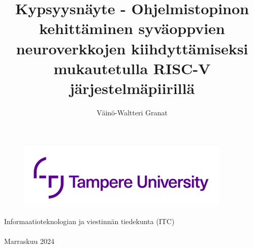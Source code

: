 \documentclass[12pt,a4paper,finnish
]{tunithesis}
\author{Väinö-Waltteri Granat}
\title{Kypsyysnäyte - Ohjelmistopinon kehittäminen syväoppvien neuroverkkojen kiihdyttämiseksi mukautetulla RISC-V järjestelmäpiirillä} %
\begin{document}
\makeatletter

\thispagestyle{empty}
\vspace*{-.5cm}\noindent

\begin{figure}
    \vspace{-1.3cm}
    \advance\leftskip-2.5cm
    \noindent\includegraphics{../thesis/img/tunilogo.png}
\end{figure}
 
\vspace{2.5cm}
\begin{flushright}
\noindent\textsf{\LARGE{\@author}}

\noindent\vspace{0.5cm}

\noindent\Huge{\textsf{\textbf{\textcolor{tunipurple}{\@title}}}}
\end{flushright}
\vspace{8.7cm} %

\begin{flushright}  
    \begin{spacing}{1.0}
      \textsf{Informaatioteknologian ja viestinnän tiedekunta (ITC)\\
      \@thesistype\\
      Marraskuu 2024}
    \end{spacing}
\end{flushright}

\if@twoside
\clearpage
\fi

%



\end{document}
